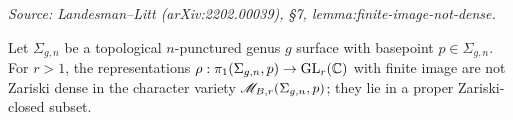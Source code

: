 \begin{lemma}
  \label{lem:finite-image-not-dense}
  \textit{Source: Landesman--Litt (arXiv:2202.00039), \S7,
    lemma:finite-image-not-dense.}

  Let $\Sigma_{g,n}$ be a topological $n$-punctured genus $g$ surface with
  basepoint $p \in \Sigma_{g,n}$. For $r > 1$, the representations
  $\rho : \pi_1(\Sigma_{g,n}, p) \to \operatorname{GL}_r(\mathbb{C})$ with finite image are not Zariski
  dense in the character variety $\mathscr{M}_{B,r}(\Sigma_{g,n}, p)$; they lie in a
  proper Zariski-closed subset.
\end{lemma}


